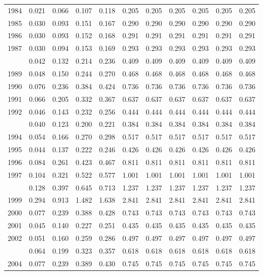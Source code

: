 \documentclass[
]{article}
\begin{document}
\begin{longtable}[t]{lrrrrrrrrrr}
1984 & 0.021 & 0.066 & 0.107 & 0.118 & 0.205 & 0.205 & 0.205 & 0.205 & 0.205 & 0.205\\
1985 & 0.030 & 0.093 & 0.151 & 0.167 & 0.290 & 0.290 & 0.290 & 0.290 & 0.290 & 0.290\\
1986 & 0.030 & 0.093 & 0.152 & 0.168 & 0.291 & 0.291 & 0.291 & 0.291 & 0.291 & 0.291\\
1987 & 0.030 & 0.094 & 0.153 & 0.169 & 0.293 & 0.293 & 0.293 & 0.293 & 0.293 & 0.293\\
\addlinespace
1988 & 0.042 & 0.132 & 0.214 & 0.236 & 0.409 & 0.409 & 0.409 & 0.409 & 0.409 & 0.409\\
1989 & 0.048 & 0.150 & 0.244 & 0.270 & 0.468 & 0.468 & 0.468 & 0.468 & 0.468 & 0.468\\
1990 & 0.076 & 0.236 & 0.384 & 0.424 & 0.736 & 0.736 & 0.736 & 0.736 & 0.736 & 0.736\\
1991 & 0.066 & 0.205 & 0.332 & 0.367 & 0.637 & 0.637 & 0.637 & 0.637 & 0.637 & 0.637\\
1992 & 0.046 & 0.143 & 0.232 & 0.256 & 0.444 & 0.444 & 0.444 & 0.444 & 0.444 & 0.444\\
\addlinespace
1993 & 0.040 & 0.123 & 0.200 & 0.221 & 0.384 & 0.384 & 0.384 & 0.384 & 0.384 & 0.384\\
1994 & 0.054 & 0.166 & 0.270 & 0.298 & 0.517 & 0.517 & 0.517 & 0.517 & 0.517 & 0.517\\
1995 & 0.044 & 0.137 & 0.222 & 0.246 & 0.426 & 0.426 & 0.426 & 0.426 & 0.426 & 0.426\\
1996 & 0.084 & 0.261 & 0.423 & 0.467 & 0.811 & 0.811 & 0.811 & 0.811 & 0.811 & 0.811\\
1997 & 0.104 & 0.321 & 0.522 & 0.577 & 1.001 & 1.001 & 1.001 & 1.001 & 1.001 & 1.001\\
\addlinespace
1998 & 0.128 & 0.397 & 0.645 & 0.713 & 1.237 & 1.237 & 1.237 & 1.237 & 1.237 & 1.237\\
1999 & 0.294 & 0.913 & 1.482 & 1.638 & 2.841 & 2.841 & 2.841 & 2.841 & 2.841 & 2.841\\
2000 & 0.077 & 0.239 & 0.388 & 0.428 & 0.743 & 0.743 & 0.743 & 0.743 & 0.743 & 0.743\\
2001 & 0.045 & 0.140 & 0.227 & 0.251 & 0.435 & 0.435 & 0.435 & 0.435 & 0.435 & 0.435\\
2002 & 0.051 & 0.160 & 0.259 & 0.286 & 0.497 & 0.497 & 0.497 & 0.497 & 0.497 & 0.497\\
\addlinespace
2003 & 0.064 & 0.199 & 0.323 & 0.357 & 0.618 & 0.618 & 0.618 & 0.618 & 0.618 & 0.618\\
2004 & 0.077 & 0.239 & 0.389 & 0.430 & 0.745 & 0.745 & 0.745 & 0.745 & 0.745 & 0.745\\

\end{longtable}
\end{document}
